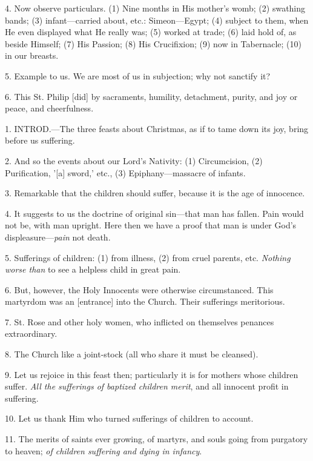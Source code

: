 4. Now observe particulars. (1) Nine months in
His mother's womb; (2) swathing bands; (3) infant—carried about,
etc.: Simeon—Egypt; (4) subject to them, when He even displayed what
He really was; (5) worked at trade; (6) laid hold of, as beside
Himself; (7) His Passion; (8) His Crucifixion; (9) now in Tabernacle;
(10) in our breasts.

5. Example to us. We are most of us in
subjection; why not sanctify it?

6. This St. Philip [did] by sacraments, humility,
detachment, purity, and joy or peace, and cheerfulness.


1. INTROD.—The
three feasts about Christmas, as if to tame down its joy, bring before
us suffering.

2. And so the events about our Lord's Nativity:
(1) Circumcision, (2) Purification, '[a] sword,' etc., (3)
Epiphany—massacre of infants.

3. Remarkable that the children should suffer,
because it is the age of innocence.

4. It suggests to us the doctrine of original
sin—that man has fallen. Pain would not be, with man upright. Here
then we have a proof that man is under God's displeasure—\emph{pain}
not death.

5. Sufferings of children: (1) from illness, (2)
from cruel parents, etc. \emph{Nothing worse than} to see a helpless
child in great pain.

6. But, however, the Holy Innocents were
otherwise circumstanced. This martyrdom was an [entrance] into the
Church. Their sufferings meritorious.

7. St. Rose and other holy women, who inflicted
on themselves penances extraordinary.

8. The Church like a joint-stock (all who share
it must be cleansed).

9. Let us rejoice in this feast then;
particularly it is for mothers whose children suffer. \emph{All the
sufferings of baptized children merit}, and all innocent profit in
suffering.

10. Let us thank Him who turned sufferings of
children to account.

11. The merits of saints ever growing, of
martyrs, and souls going from purgatory to heaven; \emph{of children
suffering and dying in infancy}.


